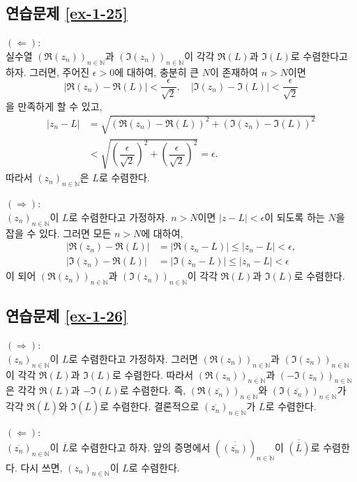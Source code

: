 \subsection*{연습문제 \ref{ex-1-25}}

$(\Leftarrow):$ \\[1ex]
실수열 $(\Re(z_n))_{n\in\mathbb N}$과 
$(\Im(z_n))_{n\in\mathbb N}$이 각각 $\Re(L)$과 $\Im(L)$로 수렴한다고 하자.
그러면, 주어진 $\epsilon>0$에 대하여,
충분히 큰 $N$이 존재하여 $n>N$이면
\[
|\Re(z_n) - \Re(L)| < \dfrac\epsilon{\sqrt{2}},\quad
|\Im(z_n) - \Im(L)| < \dfrac\epsilon{\sqrt{2}}
\]
을 만족하게 할 수 있고,
\begin{align*}
|z_n-L| &= \sqrt{ (\Re(z_n) - \Re(L))^2 + (\Im(z_n) - \Im(L))^2} \\
&< \sqrt{\left(\dfrac\epsilon{\sqrt{2}}\right)^2  + \left(\dfrac\epsilon{\sqrt{2}}\right)^2}
= \epsilon.
\end{align*}
따라서 $(z_n)_{n\in\mathbb N}$은 $L$로 수렴한다.

\noindent $(\Rightarrow):$\\[1ex]
$(z_n)_{n\in\mathbb N}$이 $L$로 수렴한다고 가정하자.
$n>N$이면  $|z-L|<\epsilon$이 되도록 하는 $N$을 잡을 수 있다.
그러면 모든 $n>N$에 대하여,
\begin{align*}
|\Re(z_n) - \Re(L)| &= |\Re(z_n -L)| \le |z_n -L| <\epsilon, \\
|\Im(z_n) - \Re(L)| &= |\Im(z_n -L)| \le |z_n -L| <\epsilon
\end{align*}
이 되어
$(\Re(z_n))_{n\in\mathbb N}$과 
$(\Im(z_n))_{n\in\mathbb N}$이 각각 
$\Re(L)$과 $\Im(L)$로 수렴한다.

\subsection*{연습문제 \ref{ex-1-26}}

$(\Rightarrow):$\\[1ex]
$(z_n)_{n\in\mathbb N}$이 $L$로 수렴한다고 가정하자.
그러면 $(\Re(z_n))_{n\in\mathbb N}$과 
$(\Im(z_n))_{n\in\mathbb N}$이 각각 
$\Re(L)$과 $\Im(L)$로 수렴한다.
따라서 $(\Re(z_n))_{n\in\mathbb N}$과 
$(-\Im(z_n))_{n\in\mathbb N}$은 각각 
$\Re(L)$과 $-\Im(L)$로 수렴한다.
즉, $(\Re(\overline{z_n}))_{n\in\mathbb N}$와
$(\Im(\overline{z_n}))_{n\in\mathbb N}$가 각각 
$\Re(\overline{L})$와 $\Im(\overline{L})$로 수렴한다.
결론적으로 $(\overline{z_n})_{n\in\mathbb N}$가 $\overline{L}$로 수렴한다.

\noindent $(\Leftarrow):$ \\[1ex]
$(\overline{z_n})_{n\in\mathbb N}$이 $\overline{L}$로 수렴한다고 하자.
앞의 증명에서 $(\overline{(\overline{z_n})})_{n\in\mathbb N}$이 
$\overline{(\overline{L})}$로 수렴한다.
다시 쓰면, $(z_n)_{n\in\mathbb N}$이 $L$로 수렴한다.


